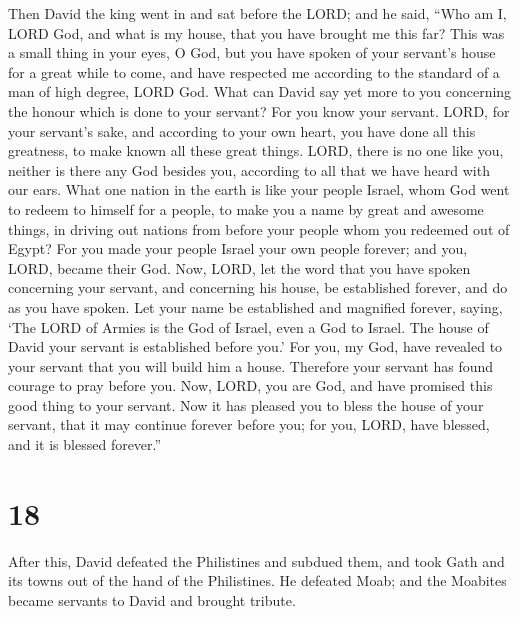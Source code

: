  Then David the king went in and sat before the LORD; and
he said, ``Who am I, LORD God, and what is my house, that you have
brought me this far?  This was a small thing in your eyes,
O God, but you have spoken of your servant's house for a great while to
come, and have respected me according to the standard of a man of high
degree, LORD God.  What can David say yet more to you
concerning the honour which is done to your servant? For you know your
servant.  LORD, for your servant's sake, and according to
your own heart, you have done all this greatness, to make known all
these great things.  LORD, there is no one like you,
neither is there any God besides you, according to all that we have
heard with our ears.  What one nation in the earth is like
your people Israel, whom God went to redeem to himself for a people, to
make you a name by great and awesome things, in driving out nations from
before your people whom you redeemed out of Egypt?  For you
made your people Israel your own people forever; and you, LORD, became
their God.  Now, LORD, let the word that you have spoken
concerning your servant, and concerning his house, be established
forever, and do as you have spoken.  Let your name be
established and magnified forever, saying, `The LORD of Armies is the
God of Israel, even a God to Israel. The house of David your servant is
established before you.'  For you, my God, have revealed to
your servant that you will build him a house. Therefore your servant has
found courage to pray before you.  Now, LORD, you are God,
and have promised this good thing to your servant.  Now it
has pleased you to bless the house of your servant, that it may continue
forever before you; for you, LORD, have blessed, and it is blessed
forever.''

\hypertarget{section-17}{%
\section{18}\label{section-17}}

 After this, David defeated the Philistines and subdued
them, and took Gath and its towns out of the hand of the Philistines.
 He defeated Moab; and the Moabites became servants to David
and brought tribute.


